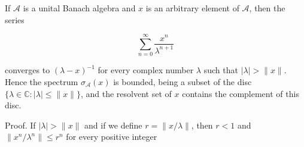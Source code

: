 If $\mathcal{A}$ is a unital Banach algebra and $x$ is an arbitrary element of $\mathcal{A}$, then the series

$$\sum_{n=0}^{\infty} \frac{x^n}{\lambda^{n+1}}$$

converges to $(\lambda - x)^{-1}$ for every complex number $\lambda$ such that $|\lambda| > \|x\|$. Hence the spectrum $\sigma_{\mathcal{A}}(x)$ is bounded, being a subset of the disc $\{\lambda \in \mathbb{C}: |\lambda| \leq \|x\|\}$, and the resolvent set of $x$ contains the complement of this disc.

Proof. If $|\lambda| > \|x\|$ and if we define $r = \|x/\lambda\|$, then $r < 1$ and $\|x^n/\lambda^n\| \leq r^n$ for every positive integer
